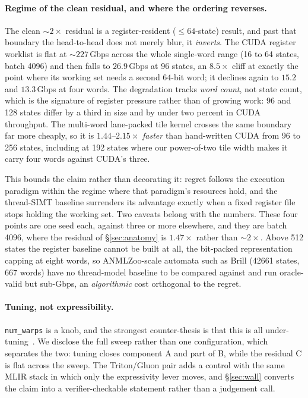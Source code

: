 \documentclass[sigplan,review,nonacm,10pt]{acmart}
\begin{document}
\paragraph{Regime of the clean residual, and where the ordering reverses.} The clean
${\sim}2\times$ residual is a register-resident ($\le 64$-state) result, and past that
boundary the head-to-head does not merely blur, it \emph{inverts}. The CUDA register
worklist is flat at ${\sim}227$\,Gbps across the whole single-word range (16 to 64 states,
batch 4096) and then falls to $26.9$\,Gbps at 96 states, an $8.5\times$ cliff at exactly the
point where its working set needs a second $64$-bit word; it declines again to $15.2$ and
$13.3$\,Gbps at four words. The degradation tracks \emph{word count}, not state count,
which is the signature of register pressure rather than of growing work: 96 and 128 states
differ by a third in size and by under two percent in CUDA throughput. The
multi-word lane-packed tile kernel crosses the same boundary far more cheaply, so it is
$1.44$--$2.15\times$ \emph{faster} than hand-written CUDA from 96 to 256 states, including
at 192 states where our power-of-two tile width makes it carry four words against CUDA's
three.

This bounds the claim rather than decorating it: regret follows the execution paradigm
within the regime where that paradigm's resources hold, and the thread-SIMT baseline
surrenders its advantage exactly when a fixed register file stops holding the working set.
Two caveats belong with the numbers. These four points are one seed each, against three or
more elsewhere, and they are batch 4096, where the residual of \S\ref{sec:anatomy} is
$1.47\times$ rather than ${\sim}2\times$. Above 512 states the register baseline cannot be
built at all, the bit-packed representation capping at eight words, so ANMLZoo-scale
automata such as Brill (42661 states, 667 words) have no thread-model baseline to be
compared against and run oracle-valid but sub-Gbps, an \emph{algorithmic} cost orthogonal
to the regret.

\paragraph{Tuning, not expressibility.} \texttt{num\_warps} is a knob, and the strongest
counter-thesis is that this is all under-tuning~\cite{ringlein2025}. We disclose the full
sweep rather than one configuration, which separates the two: tuning closes component A and
part of B, while the residual C is flat across the sweep. The Triton/Gluon pair adds a
control with the same MLIR stack in which only the expressivity lever moves, and
\S\ref{sec:wall} converts the claim into a verifier-checkable statement rather than a
judgement call.
\end{document}
